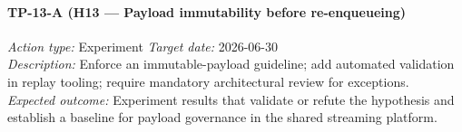 \paragraph{TP-13-A \textnormal{(H13 — Payload immutability before re-enqueueing)}}
\textit{Action type:} Experiment \quad \textit{Target date:} 2026-06-30 \\
\textit{Description:} Enforce an immutable-payload guideline; add automated
validation in replay tooling; require mandatory architectural review for
exceptions. \\
\textit{Expected outcome:} Experiment results that validate or refute the
hypothesis and establish a baseline for payload governance in the shared
streaming platform.
